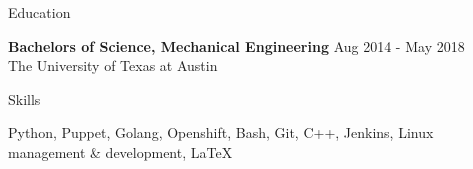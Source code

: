 \documentclass{resume} %
\begin{document}

\begin{rSection}{Education}

{\bf Bachelors of Science, Mechanical Engineering } \hfill { Aug 2014 - May 2018} 
\\{ { The University of Texas at Austin}} 

\end{rSection}

\begin{rSection}{Skills}

Python, Puppet, Golang, Openshift, Bash, Git, C++, Jenkins, Linux management \& development, \LaTeX


\end{rSection}
\end{document}
